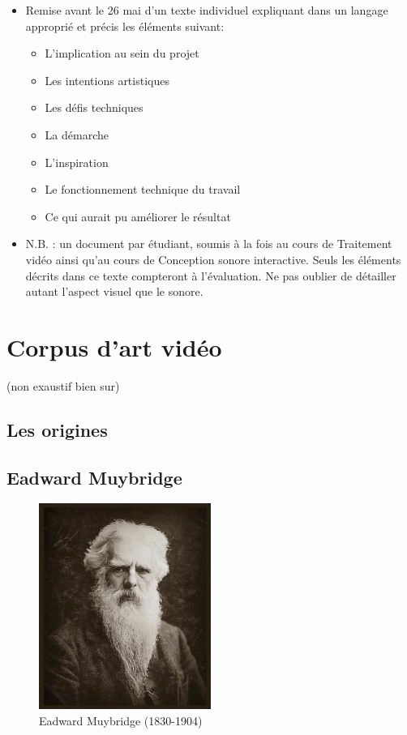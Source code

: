 \documentclass[
  french,
]{book}
\providecommand{\tightlist}{%
  \setlength{\itemsep}{0pt}\setlength{\parskip}{0pt}}
\begin{document}
\begin{itemize}
\tightlist
\item
  Remise avant le 26 mai d'un texte individuel expliquant dans un langage approprié et précis les éléments suivant:

  \begin{itemize}
  \tightlist
  \item
    L'implication au sein du projet
  \item
    Les intentions artistiques
  \item
    Les défis techniques
  \item
    La démarche
  \item
    L'inspiration
  \item
    Le fonctionnement technique du travail
  \item
    Ce qui aurait pu améliorer le résultat
  \end{itemize}
\item
  N.B. : un document par étudiant, soumis à la fois au cours de Traitement vidéo ainsi qu'au cours de Conception sonore interactive. Seuls les éléments décrits dans ce texte compteront à l'évaluation. Ne pas oublier de détailler autant l'aspect visuel que le sonore.
\end{itemize}

\hypertarget{corpus}{%
\chapter{Corpus d'art vidéo}\label{corpus}}

(non exaustif bien sur)

\hypertarget{les-origines}{%
\section{Les origines}\label{les-origines}}

\hypertarget{eadward-muybridge}{%
\section{Eadward Muybridge}\label{eadward-muybridge}}

\begin{figure}
\centering
\includegraphics[width=0.5\textwidth,height=\textheight]{medias/corpus/muybridge/Optic_Projection_fig_411.jpg}
\caption{Eadward Muybridge (1830-1904)}
\end{figure}
\end{document}
